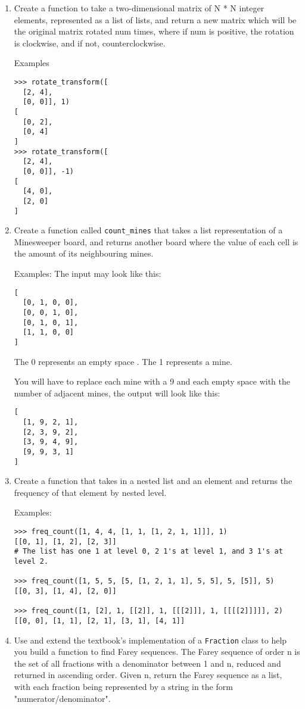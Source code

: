 \documentclass{article}
\newcommand{\li}{\item}
\begin{document}
\begin{enumerate}
\li Create a function to take a two-dimensional matrix of N * N integer elements,
represented as a list of lists, and return a new matrix which
will be the original matrix rotated num times, 
where if num is positive, the rotation is clockwise, and if not, counterclockwise.

Examples
\begin{lstlisting}
>>> rotate_transform([
  [2, 4],
  [0, 0]], 1) 
[
  [0, 2],
  [0, 4]
]
>>> rotate_transform([
  [2, 4],
  [0, 0]], -1)
[
  [4, 0],
  [2, 0]
]
\end{lstlisting}

\li
Create a function called \lstinline{count_mines}
 that takes a list representation of a Minesweeper board, 
 and returns another board where the value of each cell is 
 the amount of its neighbouring mines.

Examples:
The input may look like this:
\begin{lstlisting}
[
  [0, 1, 0, 0],
  [0, 0, 1, 0],
  [0, 1, 0, 1],
  [1, 1, 0, 0]
]
\end{lstlisting}
The 0 represents an empty space . The 1 represents a mine.

You will have to replace each mine with a 9 and each empty space with the number of adjacent mines, the output will look like this:
\begin{lstlisting}
[
  [1, 9, 2, 1],
  [2, 3, 9, 2],
  [3, 9, 4, 9],
  [9, 9, 3, 1]
]
\end{lstlisting}

\li
Create a function that takes in a nested list and an element and returns the frequency of that element by nested level.

Examples:
\begin{lstlisting}
>>> freq_count([1, 4, 4, [1, 1, [1, 2, 1, 1]]], 1)
[[0, 1], [1, 2], [2, 3]]
# The list has one 1 at level 0, 2 1's at level 1, and 3 1's at level 2.

>>> freq_count([1, 5, 5, [5, [1, 2, 1, 1], 5, 5], 5, [5]], 5)
[[0, 3], [1, 4], [2, 0]]

>>> freq_count([1, [2], 1, [[2]], 1, [[[2]]], 1, [[[[2]]]]], 2)
[[0, 0], [1, 1], [2, 1], [3, 1], [4, 1]]
\end{lstlisting}

\li Use and extend the textbook's implementation of a \lstinline{Fraction} class to help you
build a function to find Farey sequences.
The Farey sequence of order n is the set of all fractions with a denominator between 1 and n, reduced and returned in ascending order. Given n, return the Farey sequence as a list, with each fraction being represented by a string in the form "numerator/denominator".


\end{enumerate}
\end{document}
